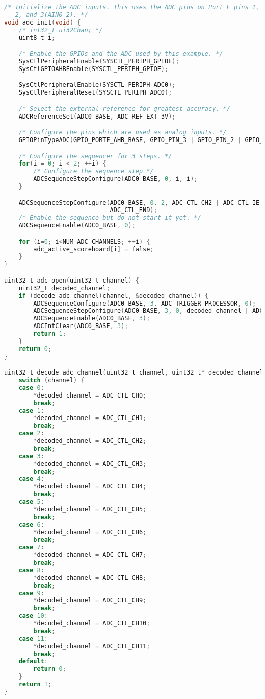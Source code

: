 \documentclass[12pt]{article}
\begin{document}
\begin{enumerate}[1)]
\begin{lstlisting}[language=C]
/* Initialize the ADC inputs. This uses the ADC pins on Port E pins 1,
   2, and 3(AIN0-2). */
void adc_init(void) {
    /* int32_t ui32Chan; */
    uint8_t i;

    /* Enable the GPIOs and the ADC used by this example. */
    SysCtlPeripheralEnable(SYSCTL_PERIPH_GPIOE);
    SysCtlGPIOAHBEnable(SYSCTL_PERIPH_GPIOE);

    SysCtlPeripheralEnable(SYSCTL_PERIPH_ADC0);
    SysCtlPeripheralReset(SYSCTL_PERIPH_ADC0);

    /* Select the external reference for greatest accuracy. */
    ADCReferenceSet(ADC0_BASE, ADC_REF_EXT_3V);

    /* Configure the pins which are used as analog inputs. */
    GPIOPinTypeADC(GPIO_PORTE_AHB_BASE, GPIO_PIN_3 | GPIO_PIN_2 | GPIO_PIN_1);

    /* Configure the sequencer for 3 steps. */
    for(i = 0; i < 2; ++i) {
        /* Configure the sequence step */
        ADCSequenceStepConfigure(ADC0_BASE, 0, i, i);
    }

    ADCSequenceStepConfigure(ADC0_BASE, 0, 2, ADC_CTL_CH2 | ADC_CTL_IE |
                             ADC_CTL_END);
    /* Enable the sequence but do not start it yet. */
    ADCSequenceEnable(ADC0_BASE, 0);

    for (i=0; i<NUM_ADC_CHANNELS; ++i) {
        adc_active_scoreboard[i] = false;
    }
}

uint32_t adc_open(uint32_t channel) {
    uint32_t decoded_channel;
    if (decode_adc_channel(channel, &decoded_channel)) {
        ADCSequenceConfigure(ADC0_BASE, 3, ADC_TRIGGER_PROCESSOR, 0);
        ADCSequenceStepConfigure(ADC0_BASE, 3, 0, decoded_channel | ADC_CTL_IE | ADC_CTL_END);
        ADCSequenceEnable(ADC0_BASE, 3);
        ADCIntClear(ADC0_BASE, 3);
        return 1;
    }
    return 0;
}

uint32_t decode_adc_channel(uint32_t channel, uint32_t* decoded_channel) {
    switch (channel) {
    case 0:
        *decoded_channel = ADC_CTL_CH0;
        break;
    case 1:
        *decoded_channel = ADC_CTL_CH1;
        break;
    case 2:
        *decoded_channel = ADC_CTL_CH2;
        break;
    case 3:
        *decoded_channel = ADC_CTL_CH3;
        break;
    case 4:
        *decoded_channel = ADC_CTL_CH4;
        break;
    case 5:
        *decoded_channel = ADC_CTL_CH5;
        break;
    case 6:
        *decoded_channel = ADC_CTL_CH6;
        break;
    case 7:
        *decoded_channel = ADC_CTL_CH7;
        break;
    case 8:
        *decoded_channel = ADC_CTL_CH8;
        break;
    case 9:
        *decoded_channel = ADC_CTL_CH9;
        break;
    case 10:
        *decoded_channel = ADC_CTL_CH10;
        break;
    case 11:
        *decoded_channel = ADC_CTL_CH11;
        break;
    default:
        return 0;
    }
    return 1;
}


\end{lstlisting}
\end{enumerate}
\end{document}
